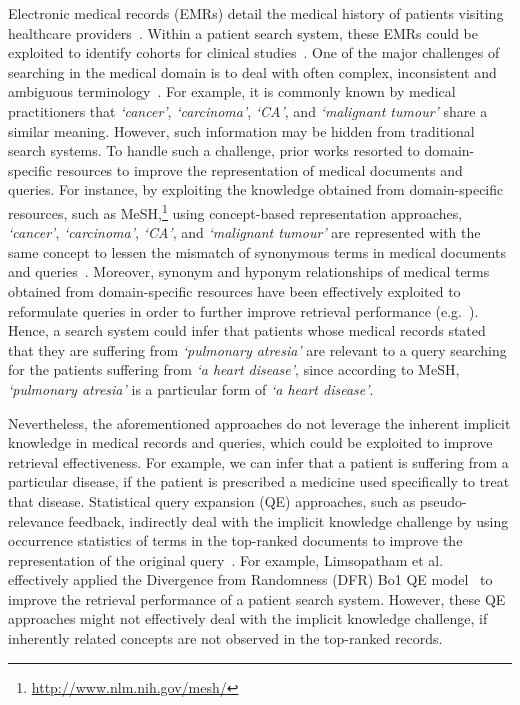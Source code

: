 \documentclass[1p]{elsarticle}
\begin{document}
 Electronic medical records (EMRs) detail the medical history of patients visiting healthcare providers~\cite{kotsipoulos,tambouris}. Within a patient search system, these EMRs could be exploited to identify cohorts for clinical studies~\cite{limsopatham2013oair,voorhees2011trec,voorhees2012trec}. One of the major challenges of searching in the medical domain is to deal with often complex, inconsistent and ambiguous terminology~\cite{krauthammer2004jbi,limsopatham2011sigir,trieschnigg2010cikm}. For example, it is commonly known by medical practitioners that \emph{`cancer'}, \emph{`carcinoma'}, \emph{`CA'}, and \emph{`malignant tumour'} share a similar meaning. However, such information may be hidden from traditional search systems. To handle such a challenge, prior works resorted to domain-specific resources to improve the representation of medical documents and queries. For instance, by exploiting the knowledge obtained from domain-specific resources, such as MeSH,\footnote{\url{http://www.nlm.nih.gov/mesh/}} using concept-based representation approaches, \emph{`cancer'}, \emph{`carcinoma'}, \emph{`CA'}, and \emph{`malignant tumour'} are represented with the same concept to lessen the mismatch of synonymous terms in medical documents and queries~\cite{trieschnigg2010cikm,hersh1994jamia,srinivasan1996ipma}. Moreover, synonym and hyponym relationships of medical terms obtained from domain-specific resources have been effectively exploited to reformulate queries in order to further improve retrieval performance (e.g.~\cite{aronson1997amia,srinivasan1996ipmb}). Hence, a search system could infer that patients whose medical records stated that they are suffering from \emph{`pulmonary atresia'} are relevant to a query searching for the patients suffering from \emph{`a heart disease'}, since according to MeSH, \emph{`pulmonary atresia'} is a particular form of \emph{`a heart disease'}. 

Nevertheless, the aforementioned approaches do not leverage the inherent implicit knowledge in medical records and queries, which could be exploited to improve retrieval effectiveness. For example, we can infer that a patient is suffering from a particular disease, if the patient is prescribed a medicine used specifically to treat that disease. Statistical query expansion (QE) approaches, such as pseudo-relevance feedback, indirectly deal with the implicit knowledge challenge by using occurrence statistics of terms in the top-ranked documents to improve the representation of the original query~\cite{amati2003thesis}. For example, Limsopatham et al.~\cite{limsopatham2012sigir,limsopatham2015cikm} effectively applied the Divergence from Randomness (DFR) Bo1 QE model~\cite{amati2003thesis} to improve the retrieval performance of a patient search system.
However, these QE approaches might not effectively deal with the implicit knowledge challenge, if inherently related concepts are not observed in the top-ranked records.
\end{document}
